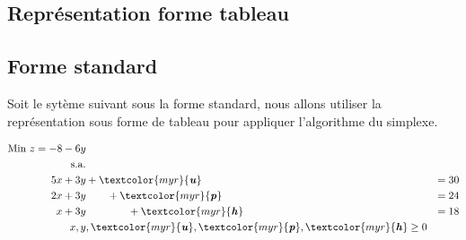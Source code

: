 \documentclass{report}
\begin{document}
\begin{multicols*}{2}

\chapter{Représentation forme tableau }

\section{Forme standard}

Soit le sytème suivant sous la forme standard, nous allons 
utiliser la représentation sous forme de tableau pour appliquer
l'algorithme du simplexe. 

\begin{align*}
    \text{Min } z = -8 -6y \\ 
    \text{s.a.} 
    \\
    5x + 3y& + \textcolor{myr}{\textbf{\textit{u}}}   &= 30 \\
    2x + 3y& \quad\quad + \textcolor{myr}{\textbf{\textit{p}}}   &= 24\\
     x + 3y& \quad\quad\quad\quad + \textcolor{myr}{\textbf{\textit{h}}}   &= 18 \\
     x, y&,  
     \textcolor{myr}{\textbf{\textit{u}}}, 
     \textcolor{myr}{\textbf{\textit{p}}},
     \textcolor{myr}{\textbf{\textit{h}}} \geq 0
\end{align*}



\end{multicols*}
\end{document}
